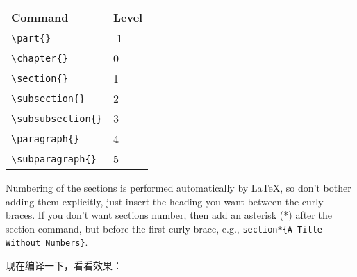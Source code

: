 \begin{codeblock}[.9]
\begin{latexcode}
  \begin{center}
    \begin{tabular}{ll}
      \hline 
      Command & Level \\ \hline
      \verb|\part{}| & -1 \\
      \verb|\chapter{}| & 0 \\
      \verb|\section{}| & 1 \\
      \verb|\subsection{}| & 2 \\
      \verb|\subsubsection{}| & 3 \\
      \verb|\paragraph{}| & 4 \\
      \verb|\subparagraph{}| & 5 \\
      \hline
    \end{tabular}
  \end{center}

  Numbering of the sections is performed automatically by
  \LaTeX{}, so don't bother adding them explicitly, just
  insert the heading you want between the curly braces. If
  you don't want sections number, then add an asterisk (*)
  after the section command, but before the first curly
  brace, e.g., \verb|section*{A Title Without Numbers}|.
\end{latexcode}
\end{codeblock}

现在编译一下，看看效果：

\begin{center}
\end{center}

